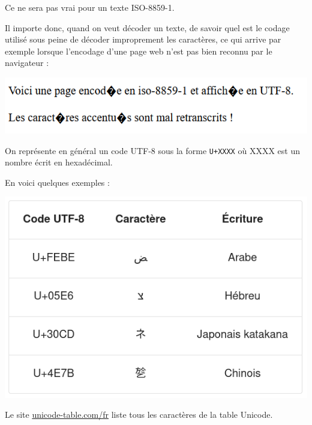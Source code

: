 \documentclass[11pt,a4paper]{article}
\begin{document}
Ce ne sera pas vrai pour un texte ISO-8859-1.

\newpage

Il importe donc, quand on veut décoder un texte, de savoir quel est le
codage utilisé sous peine de décoder improprement les caractères, ce qui
arrive par exemple lorsque l'encodage d'une page web n'est pas bien
reconnu par le navigateur :

\begin{center}
  

\includegraphics[scale=0.75]{../../../assets/images/erreur_encodage.png}
\end{center}

On représente en général un code UTF-8 sous la forme \texttt{U+XXXX} où
XXXX est un nombre écrit en hexadécimal.

En voici quelques exemples :

\begin{center}
  \includegraphics[scale=0.5]{tab_unicode.png}
\end{center}

Le site \url{unicode-table.com/fr} liste tous les caractères de la
table Unicode.

\medskip
\end{document}
